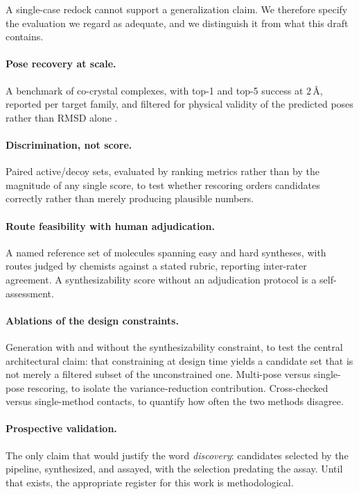 \documentclass[10pt,twocolumn]{article}
\begin{document}
A single-case redock cannot support a generalization claim. We therefore
specify the evaluation we regard as adequate, and we distinguish it from what
this draft contains.

\paragraph{Pose recovery at scale.} A benchmark of co-crystal complexes, with
top-1 and top-5 success at 2\,\AA{}, reported per target family, and filtered
for physical validity of the predicted poses rather than RMSD alone
\citep{buttenschoen2024posebusters}.

\paragraph{Discrimination, not score.} Paired active/decoy sets, evaluated by
ranking metrics rather than by the magnitude of any single score, to test
whether rescoring orders candidates correctly rather than merely producing
plausible numbers.

\paragraph{Route feasibility with human adjudication.} A named reference set of
molecules spanning easy and hard syntheses, with routes judged by chemists
against a stated rubric, reporting inter-rater agreement. A synthesizability
score without an adjudication protocol is a self-assessment.

\paragraph{Ablations of the design constraints.} Generation with and without
the synthesizability constraint, to test the central architectural claim: that
constraining at design time yields a candidate set that is not merely a filtered
subset of the unconstrained one. Multi-pose versus single-pose rescoring, to
isolate the variance-reduction contribution. Cross-checked versus
single-method contacts, to quantify how often the two methods disagree.

\paragraph{Prospective validation.} The only claim that would justify the word
\emph{discovery}: candidates selected by the pipeline, synthesized, and assayed,
with the selection predating the assay. Until that exists, the appropriate
register for this work is methodological.
\end{document}
